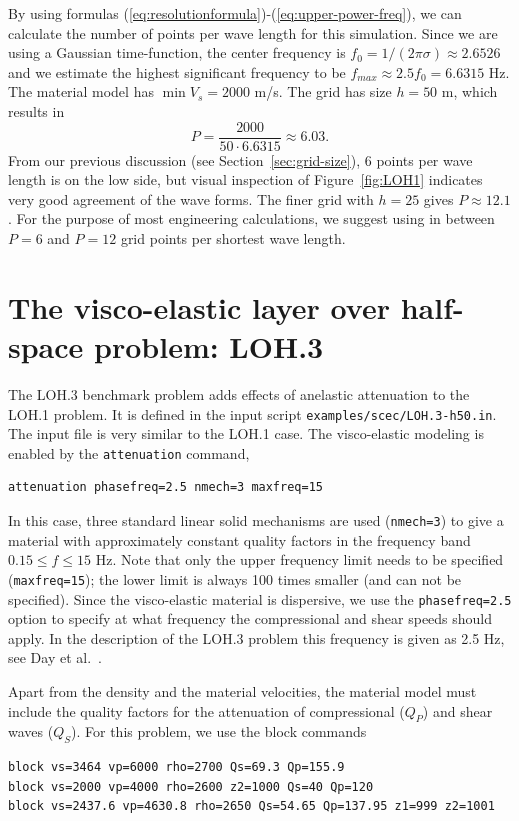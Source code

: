 \documentclass[11pt]{report}
\begin{document}
By using formulas (\ref{eq:resolutionformula})-(\ref{eq:upper-power-freq}), we can calculate the
number of points per wave length for this simulation. Since we are using a Gaussian time-function,
the center frequency is $f_0=1/(2\pi\sigma)\approx 2.6526$ and we estimate the highest significant
frequency to be $f_{max}\approx 2.5 f_0 = 6.6315$ Hz. The material model has $\min V_s = 2000$
m/s. The grid has size $h=50$ m, which results in
\[
P = \dfrac{2000}{50\cdot 6.6315} \approx 6.03.
\]
From our previous discussion (see Section~\ref{sec:grid-size}), 6 points per wave length is on the
low side, but visual inspection of Figure~\ref{fig:LOH1} indicates very good agreement of the wave
forms. The finer grid with $h=25$ gives $P\approx 12.1$. For the purpose of most engineering
calculations, we suggest using in between $P=6$ and $P=12$ grid points per shortest wave length.

\section{The visco-elastic layer over half-space problem: LOH.3}
The LOH.3 benchmark problem adds effects of anelastic attenuation to the LOH.1 problem. It is
defined in the input script \verb+examples/scec/LOH.3-h50.in+. The input file is very similar to the
LOH.1 case. The visco-elastic modeling is enabled by the \verb+attenuation+ command,
\begin{verbatim}
attenuation phasefreq=2.5 nmech=3 maxfreq=15
\end{verbatim}
In this case, three standard linear solid mechanisms are used (\verb+nmech=3+) to give a material
with approximately constant quality factors in the frequency band $0.15 \leq f \leq 15$ Hz. Note
that only the upper frequency limit needs to be specified (\verb+maxfreq=15+); the lower limit is
always 100 times smaller (and can not be specified). Since the visco-elastic material is dispersive,
we use the \verb+phasefreq=2.5+ option to specify at what frequency the compressional and shear
speeds should apply. In the description of the LOH.3 problem this frequency is given as 2.5 Hz, see
Day et al.~\cite{Day-2003}.

Apart from the density and the material velocities, the material model must include the quality
factors for the attenuation of compressional ($Q_P$) and shear waves ($Q_S$). For this problem, we
use the block commands
\begin{verbatim}
block vs=3464 vp=6000 rho=2700 Qs=69.3 Qp=155.9
block vs=2000 vp=4000 rho=2600 z2=1000 Qs=40 Qp=120
block vs=2437.6 vp=4630.8 rho=2650 Qs=54.65 Qp=137.95 z1=999 z2=1001
\end{verbatim}
\end{document}
